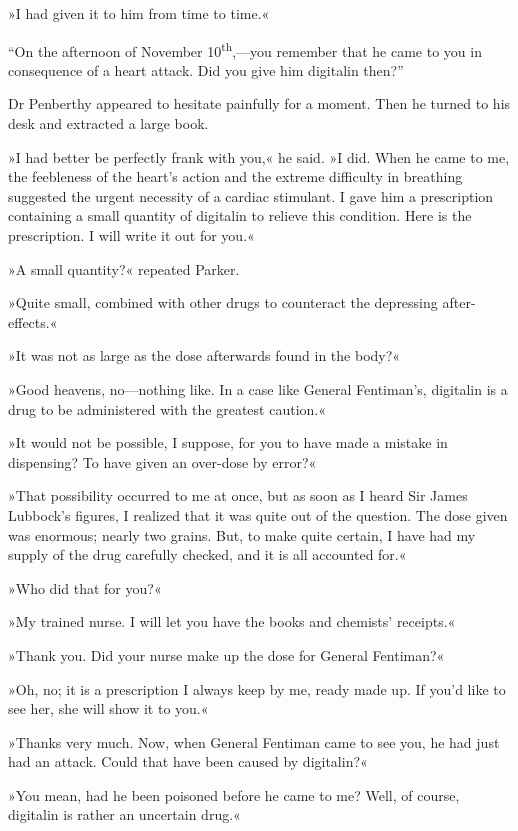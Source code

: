 »I had given it to him from time to time.«

\enquote{On the afternoon of November  10\textsuperscript{th},---you remember that he came to you in consequence of a heart attack. Did you give him digitalin then?}

Dr Penberthy appeared to hesitate painfully for a moment. Then he turned to his desk and extracted a large book.

»I had better be perfectly frank with you,« he said. »I did. When he came to me, the feebleness of the heart's action and the extreme difficulty in breathing suggested the urgent necessity of a cardiac stimulant. I gave him a prescription containing a small quantity of digitalin to relieve this condition. Here is the prescription. I will write it out for you.«

»A small quantity?« repeated Parker.

»Quite small, combined with other drugs to counteract the depressing after-effects.«

»It was not as large as the dose afterwards found in the body?«

»Good heavens, no\allowbreak---\allowbreak nothing like. In a case like General Fentiman's, digitalin is a drug to be administered with the greatest caution.«

»It would not be possible, I suppose, for you to have made a mistake in dispensing? To have given an over-dose by error?«

»That possibility occurred to me at once, but as soon as I heard Sir James Lubbock's figures, I realized that it was quite out of the question. The dose given was enormous; nearly two grains. But, to make quite certain, I have had my supply of the drug carefully checked, and it is all accounted for.«

»Who did that for you?«

»My trained nurse. I will let you have the books and chemists' receipts.«

»Thank you. Did your nurse make up the dose for General Fentiman?«

»Oh, no; it is a prescription I always keep by me, ready made up. If you'd like to see her, she will show it to you.«

»Thanks very much. Now, when General Fentiman came to see you, he had just had an attack. Could that have been caused by digitalin?«

»You mean, had he been poisoned before he came to me? Well, of course, digitalin is rather an uncertain drug.«

